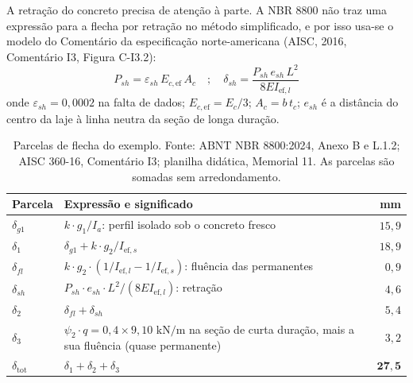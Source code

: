 \documentclass[11pt,a4paper]{article}
\begin{document}
A retração do concreto precisa de atenção à parte. A NBR 8800 não traz uma expressão para a flecha por retração no método simplificado, e por isso usa-se o modelo do Comentário da especificação norte-americana (AISC, 2016, Comentário I3, Figura C-I3.2):
\begin{equation}
  P_{sh} = \varepsilon_{sh}\, E_{c,\text{ef}}\, A_c \quad ; \quad \delta_{sh} = \frac{P_{sh}\, e_{sh}\, L^2}{8 E I_{\text{ef},l}}
  \label{eq:retracao}
\end{equation}
onde $\varepsilon_{sh} = 0{,}0002$ na falta de dados; $E_{c,\text{ef}} = E_c/3$; $A_c = b\, t_c$; $e_{sh}$ é a distância do centro da laje à linha neutra da seção de longa duração.

\begin{table}[!htbp]
  \centering
  \caption{Parcelas de flecha do exemplo. Fonte: ABNT NBR 8800:2024, Anexo B e L.1.2; AISC 360-16, Comentário I3; planilha didática, Memorial 11. As parcelas são somadas sem arredondamento.}
  \label{tab:flechas}
  \small
  \begin{tabularx}{\linewidth}{lXr}
    \toprule
    \textbf{Parcela} & \textbf{Expressão e significado} & \textbf{mm} \\
    \midrule
    $\delta_{g1}$ & $k\cdot g_1/I_a$: perfil isolado sob o concreto fresco & $15{,}9$ \\
    $\delta_1$ & $\delta_{g1} + k\cdot g_2/I_{\text{ef},s}$ & $18{,}9$ \\
    $\delta_{fl}$ & $k\cdot g_2\cdot(1/I_{\text{ef},l} - 1/I_{\text{ef},s})$: fluência das permanentes & $0{,}9$ \\
    $\delta_{sh}$ & $P_{sh}\cdot e_{sh}\cdot L^2/(8 E I_{\text{ef},l})$: retração & $4{,}6$ \\
    $\delta_2$ & $\delta_{fl} + \delta_{sh}$ & $5{,}4$ \\
    $\delta_3$ & $\psi_2\cdot q = 0{,}4 \times 9{,}10\text{ kN/m}$ na seção de curta duração, mais a sua fluência (quase permanente) & $3{,}2$ \\
    \midrule
    $\delta_{\text{tot}}$ & $\delta_1 + \delta_2 + \delta_3$ & $\mathbf{27{,}5}$ \\
    \bottomrule
  \end{tabularx}
\end{table}
\end{document}
